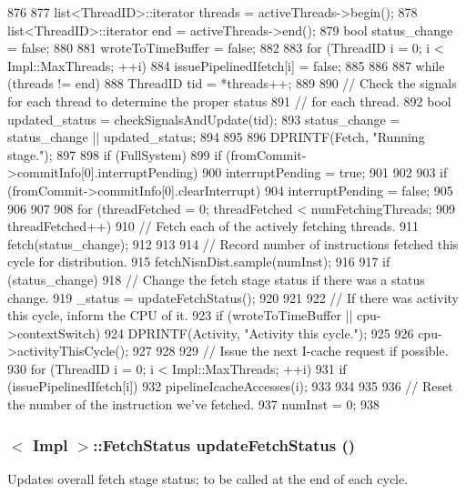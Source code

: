 \begin{DoxyCode}
876 {
877     list<ThreadID>::iterator threads = activeThreads->begin();
878     list<ThreadID>::iterator end = activeThreads->end();
879     bool status_change = false;
880 
881     wroteToTimeBuffer = false;
882 
883     for (ThreadID i = 0; i < Impl::MaxThreads; ++i) {
884         issuePipelinedIfetch[i] = false;
885     }
886 
887     while (threads != end) {
888         ThreadID tid = *threads++;
889 
890         // Check the signals for each thread to determine the proper status
891         // for each thread.
892         bool updated_status = checkSignalsAndUpdate(tid);
893         status_change =  status_change || updated_status;
894     }
895 
896     DPRINTF(Fetch, "Running stage.\n");
897 
898     if (FullSystem) {
899         if (fromCommit->commitInfo[0].interruptPending) {
900             interruptPending = true;
901         }
902 
903         if (fromCommit->commitInfo[0].clearInterrupt) {
904             interruptPending = false;
905         }
906     }
907 
908     for (threadFetched = 0; threadFetched < numFetchingThreads;
909          threadFetched++) {
910         // Fetch each of the actively fetching threads.
911         fetch(status_change);
912     }
913 
914     // Record number of instructions fetched this cycle for distribution.
915     fetchNisnDist.sample(numInst);
916 
917     if (status_change) {
918         // Change the fetch stage status if there was a status change.
919         _status = updateFetchStatus();
920     }
921 
922     // If there was activity this cycle, inform the CPU of it.
923     if (wroteToTimeBuffer || cpu->contextSwitch) {
924         DPRINTF(Activity, "Activity this cycle.\n");
925 
926         cpu->activityThisCycle();
927     }
928 
929     // Issue the next I-cache request if possible.
930     for (ThreadID i = 0; i < Impl::MaxThreads; ++i) {
931         if (issuePipelinedIfetch[i]) {
932             pipelineIcacheAccesses(i);
933         }
934     }
935 
936     // Reset the number of the instruction we've fetched.
937     numInst = 0;
938 }
\end{DoxyCode}
\hypertarget{classDefaultFetch_ac244c54ec94dd5e1d886dfd022752ec8}{
\subsubsection[{updateFetchStatus}]{$<$ Impl $>$::{\bf FetchStatus} updateFetchStatus ()}}
\label{classDefaultFetch_ac244c54ec94dd5e1d886dfd022752ec8}
Updates overall fetch stage status; to be called at the end of each cycle. 


